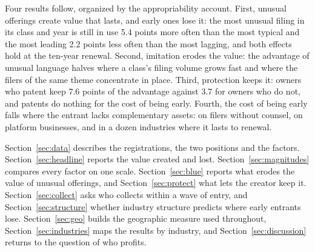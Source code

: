 Four results follow, organized by the appropriability account. First,
unusual offerings create value that lasts, and early ones lose it: the
most unusual filing in its class and year is still in use 5.4 points more
often than the most typical and the most leading 2.2 points less often
than the most lagging, and both effects hold at the ten-year renewal.
Second, imitation erodes the value: the advantage of unusual language
halves where a class's filing volume grows fast and where the filers of
the same theme concentrate in place. Third, protection keeps it: owners
who patent keep 7.6 points of the advantage against 3.7 for owners who do
not, and patents do nothing for the cost of being early. Fourth, the cost
of being early falls where the entrant lacks complementary assets: on
filers without counsel, on platform businesses, and in a dozen
industries where it lasts to renewal.


Section~\ref{sec:data} describes the registrations, the two positions
and the factors. Section~\ref{sec:headline} reports the value created
and lost. Section~\ref{sec:magnitudes} compares every factor on one
scale. Section~\ref{sec:blue} reports what erodes the value of unusual
offerings, and Section~\ref{sec:protect} what lets the creator keep it.
Section~\ref{sec:collect} asks who collects within a wave of entry, and
Section~\ref{sec:structure} whether industry structure predicts where
early entrants lose. Section~\ref{sec:geo} builds the geographic measure
used throughout, Section~\ref{sec:industries} maps the results by
industry, and Section~\ref{sec:discussion} returns to the question of
who profits.
